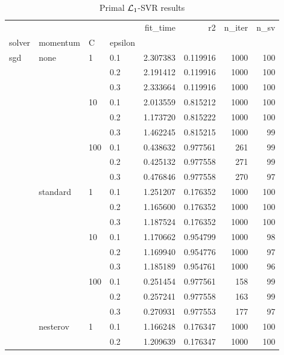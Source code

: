 \begin{table}[H]
\centering
\caption{Primal $\protect \mathcal{L}_1$-SVR results}
\label{primal_l1_svr_cv_results}
\begin{tabular}{llllrrrr}
\toprule
          &   &     &     &  fit\_time &        r2 &  n\_iter &  n\_sv \\
solver & momentum & C & epsilon &           &           &         &       \\
\midrule
sgd & none & 1   & 0.1 &  2.307383 &  0.119916 &    1000 &   100 \\
          &   &     & 0.2 &  2.191412 &  0.119916 &    1000 &   100 \\
          &   &     & 0.3 &  2.333664 &  0.119916 &    1000 &   100 \\
          &   & 10  & 0.1 &  2.013559 &  0.815212 &    1000 &   100 \\
          &   &     & 0.2 &  1.173720 &  0.815222 &    1000 &   100 \\
          &   &     & 0.3 &  1.462245 &  0.815215 &    1000 &    99 \\
          &   & 100 & 0.1 &  0.438632 &  0.977561 &     261 &    99 \\
          &   &     & 0.2 &  0.425132 &  0.977558 &     271 &    99 \\
          &   &     & 0.3 &  0.476846 &  0.977558 &     270 &    97 \\
          & standard & 1   & 0.1 &  1.251207 &  0.176352 &    1000 &   100 \\
          &   &     & 0.2 &  1.165600 &  0.176352 &    1000 &   100 \\
          &   &     & 0.3 &  1.187524 &  0.176352 &    1000 &   100 \\
          &   & 10  & 0.1 &  1.170662 &  0.954799 &    1000 &    98 \\
          &   &     & 0.2 &  1.169940 &  0.954776 &    1000 &    97 \\
          &   &     & 0.3 &  1.185189 &  0.954761 &    1000 &    96 \\
          &   & 100 & 0.1 &  0.251454 &  0.977561 &     158 &    99 \\
          &   &     & 0.2 &  0.257241 &  0.977558 &     163 &    99 \\
          &   &     & 0.3 &  0.270931 &  0.977553 &     177 &    97 \\
          & nesterov & 1   & 0.1 &  1.166248 &  0.176347 &    1000 &   100 \\
          &   &     & 0.2 &  1.209639 &  0.176347 &    1000 &   100 \\

\end{tabular}
\end{table}
